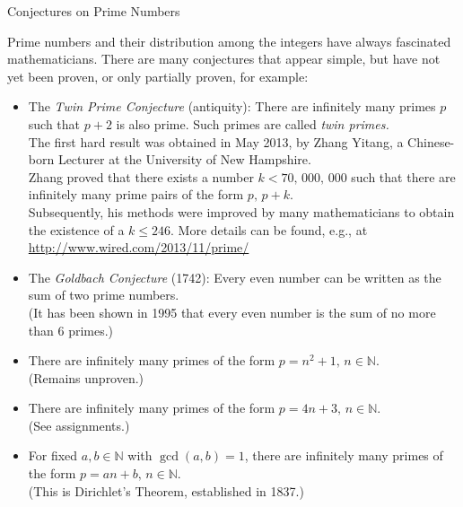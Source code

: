 \documentclass[smaller,hyperref={CJKbookmarks=true}]{beamer}
\newcommand{\N}{\mathbb{N}} \newcommand{\Z}{\mathbb{Z}} \newcommand{\Q}{\mathbb{Q}}
\begin{document}
\begin{frame}{Conjectures on Prime Numbers}
\begin{spacing}{1.1}
Prime numbers and their distribution among the integers have always
fascinated mathematicians. There are many conjectures that appear
simple, but have not yet been proven, or only partially proven, for example:\\[6pt]
\begin{itemize}
  \item The \emph{Twin Prime Conjecture} (antiquity): There are infinitely many primes $p$ such that $p+2$ is also prime. Such primes are called \emph{twin primes.}\\[4pt]
      The first hard result was obtained in May 2013, by Zhang Yitang, a
      Chinese-born Lecturer at the University of New Hampshire.\\[4pt]
      Zhang proved that there exists a number $k<70,\,000,\,000$ such that there are infinitely many prime pairs of the form $p,\,p+k$.\\[4pt]
      Subsequently, his methods were improved by many mathematicians to obtain the existence of a $k\leq246$. More details can be found, e.g., at\\[4pt]
      \url{http://www.wired.com/2013/11/prime/}
\newpage
  \item The \emph{Goldbach Conjecture} (1742): Every even number can be written as the sum of two prime numbers.\\[4pt]
      (It has been shown in 1995 that every even number is the sum of no more than 6 primes.)
  \item There are infinitely many primes of the form $p=n^2+1,\,n\in\N$.\\[4pt]
      (Remains unproven.)
  \item There are infinitely many primes of the form $p=4n+3,\,n\in\N$.\\[4pt]
      (See assignments.)
  \item For fixed $a,b\in\N$ with $\gcd(a,b)=1$, there are infinitely many primes of the form $p=an+b,\,n\in\N$.\\[4pt]
      (This is Dirichlet's Theorem, established in 1837.)
\end{itemize}
\end{spacing}
\end{frame}
\end{document}
